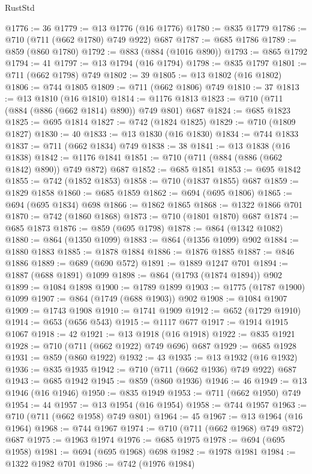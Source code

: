 \begin{lexlean}{RustStd}
\begin{coremodule}
@1776 := 36
@1779 := @13 @1776 (@16 @1776)
@1780 := @835 @1779
@1786 := @710 (@711 (@662 @1780) @749 @922) @687
@1787 := @685 @1786
@1789 := @859 (@860 @1780)
@1792 := @883 (@884 (@1016 @890))
@1793 := @865 @1792
@1794 := 41
@1797 := @13 @1794 (@16 @1794)
@1798 := @835 @1797
@1801 := @711 (@662 @1798) @749
@1802 := 39
@1805 := @13 @1802 (@16 @1802)
@1806 := @744 @1805
@1809 := @711 (@662 @1806) @749
@1810 := 37
@1813 := @13 @1810 (@16 @1810)
@1814 := @1176 @1813
@1823 := @710 (@711 (@884 (@886 (@662 @1814) @890)) @749 @801) @687
@1824 := @685 @1823
@1825 := @695 @1814
@1827 := @742 (@1824 @1825)
@1829 := @710 (@1809 @1827)
@1830 := 40
@1833 := @13 @1830 (@16 @1830)
@1834 := @744 @1833
@1837 := @711 (@662 @1834) @749
@1838 := 38
@1841 := @13 @1838 (@16 @1838)
@1842 := @1176 @1841
@1851 := @710 (@711 (@884 (@886 (@662 @1842) @890)) @749 @872) @687
@1852 := @685 @1851
@1853 := @695 @1842
@1855 := @742 (@1852 @1853)
@1858 := @710 (@1837 @1855) @687
@1859 := @1829 @1858
@1860 := @685 @1859
@1862 := @694 (@695 @1806)
@1865 := @694 (@695 @1834) @698
@1866 := @1862 @1865
@1868 := @1322 @1866 @701
@1870 := @742 (@1860 @1868)
@1873 := @710 (@1801 @1870) @687
@1874 := @685 @1873
@1876 := @859 (@695 @1798)
@1878 := @864 (@1342 @1082)
@1880 := @864 (@1350 @1099)
@1883 := @864 (@1356 @1099) @902
@1884 := @1880 @1883
@1885 := @1878 @1884
@1886 := @1876 @1885
@1887 := @846 @1886
@1889 := @689 (@690 @572)
@1891 := @1889 @1247 @701
@1894 := @1887 (@688 @1891) @1099
@1898 := @864 (@1793 (@1874 @1894)) @902
@1899 := @1084 @1898
@1900 := @1789 @1899
@1903 := @1775 (@1787 @1900) @1099
@1907 := @864 (@1749 (@688 @1903)) @902
@1908 := @1084 @1907
@1909 := @1743 @1908
@1910 := @1741 @1909
@1912 := @652 (@1729 @1910)
@1914 := @653 (@656 @543)
@1915 := @1117 @677
@1917 := @1914 @1915 @1067
@1918 := 42
@1921 := @13 @1918 (@16 @1918)
@1922 := @835 @1921
@1928 := @710 (@711 (@662 @1922) @749 @696) @687
@1929 := @685 @1928
@1931 := @859 (@860 @1922)
@1932 := 43
@1935 := @13 @1932 (@16 @1932)
@1936 := @835 @1935
@1942 := @710 (@711 (@662 @1936) @749 @922) @687
@1943 := @685 @1942
@1945 := @859 (@860 @1936)
@1946 := 46
@1949 := @13 @1946 (@16 @1946)
@1950 := @835 @1949
@1953 := @711 (@662 @1950) @749
@1954 := 44
@1957 := @13 @1954 (@16 @1954)
@1958 := @744 @1957
@1963 := @710 (@711 (@662 @1958) @749 @801)
@1964 := 45
@1967 := @13 @1964 (@16 @1964)
@1968 := @744 @1967
@1974 := @710 (@711 (@662 @1968) @749 @872) @687
@1975 := @1963 @1974
@1976 := @685 @1975
@1978 := @694 (@695 @1958)
@1981 := @694 (@695 @1968) @698
@1982 := @1978 @1981
@1984 := @1322 @1982 @701
@1986 := @742 (@1976 @1984)

\end{coremodule}
\end{lexlean}
